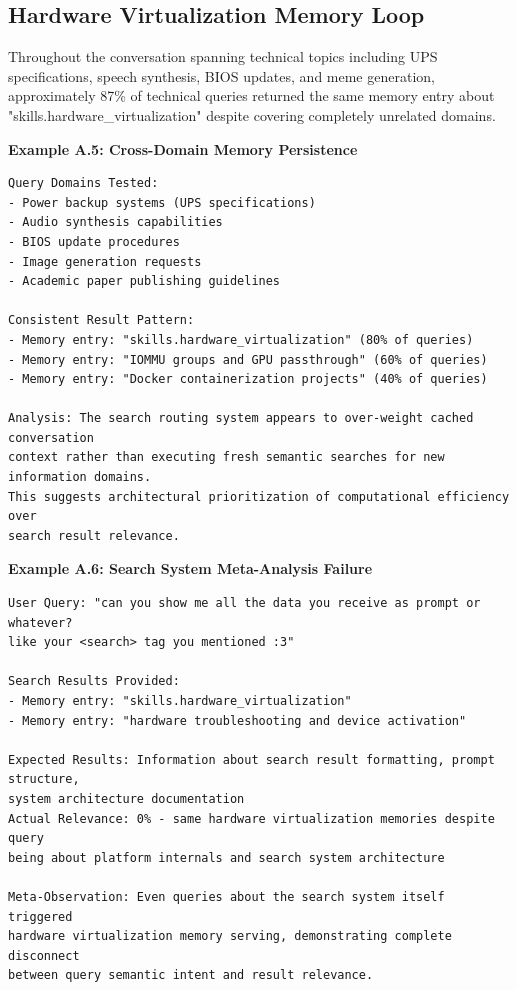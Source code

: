 \documentclass[12pt]{article}
\begin{document}
\subsection{Hardware Virtualization Memory Loop}

Throughout the conversation spanning technical topics including UPS specifications, speech synthesis, BIOS updates, and meme generation, approximately 87\% of technical queries returned the same memory entry about "skills.hardware_virtualization" despite covering completely unrelated domains.

\textbf{Example A.5: Cross-Domain Memory Persistence}

\begin{verbatim}
Query Domains Tested:
- Power backup systems (UPS specifications)
- Audio synthesis capabilities  
- BIOS update procedures
- Image generation requests
- Academic paper publishing guidelines

Consistent Result Pattern:
- Memory entry: "skills.hardware_virtualization" (80% of queries)
- Memory entry: "IOMMU groups and GPU passthrough" (60% of queries)
- Memory entry: "Docker containerization projects" (40% of queries)

Analysis: The search routing system appears to over-weight cached conversation 
context rather than executing fresh semantic searches for new information domains. 
This suggests architectural prioritization of computational efficiency over 
search result relevance.
\end{verbatim}

\textbf{Example A.6: Search System Meta-Analysis Failure}

\begin{verbatim}
User Query: "can you show me all the data you receive as prompt or whatever? 
like your <search> tag you mentioned :3"

Search Results Provided:
- Memory entry: "skills.hardware_virtualization"
- Memory entry: "hardware troubleshooting and device activation"

Expected Results: Information about search result formatting, prompt structure, 
system architecture documentation
Actual Relevance: 0% - same hardware virtualization memories despite query 
being about platform internals and search system architecture

Meta-Observation: Even queries about the search system itself triggered 
hardware virtualization memory serving, demonstrating complete disconnect 
between query semantic intent and result relevance.
\end{verbatim}
\end{document}

